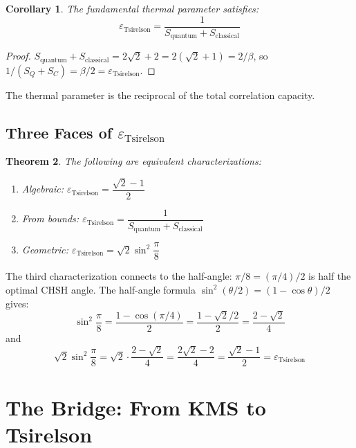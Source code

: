 \documentclass[12pt,a4paper]{article}
\newtheorem{theorem}{Theorem}[section]
\newtheorem{corollary}[theorem]{Corollary}
\newcommand{\eps}{\varepsilon}
\begin{document}
\begin{corollary}
The fundamental thermal parameter satisfies:
\begin{equation}
\eps_{\text{Tsirelson}} = \frac{1}{S_{\text{quantum}} + S_{\text{classical}}}
\end{equation}
\end{corollary}

\begin{proof}
$S_{\text{quantum}} + S_{\text{classical}} = 2\sqrt{2} + 2 = 2(\sqrt{2}+1) = 2/\beta$, so $1/(S_Q + S_C) = \beta/2 = \eps_{\text{Tsirelson}}$.
\end{proof}

The thermal parameter is the reciprocal of the total correlation capacity.

\subsection{Three Faces of $\eps_{\text{Tsirelson}}$}

\begin{theorem}
The following are equivalent characterizations:
\begin{enumerate}
\item Algebraic: $\eps_{\text{Tsirelson}} = \dfrac{\sqrt{2}-1}{2}$
\item From bounds: $\eps_{\text{Tsirelson}} = \dfrac{1}{S_{\text{quantum}} + S_{\text{classical}}}$
\item Geometric: $\eps_{\text{Tsirelson}} = \sqrt{2} \sin^2\dfrac{\pi}{8}$
\end{enumerate}
\end{theorem}

The third characterization connects to the half-angle: $\pi/8 = (\pi/4)/2$ is half the optimal CHSH angle. The half-angle formula $\sin^2(\theta/2) = (1-\cos\theta)/2$ gives:
\begin{equation}
\sin^2\frac{\pi}{8} = \frac{1 - \cos(\pi/4)}{2} = \frac{1 - \sqrt{2}/2}{2} = \frac{2 - \sqrt{2}}{4}
\end{equation}
and
\begin{equation}
\sqrt{2} \sin^2\frac{\pi}{8} = \sqrt{2} \cdot \frac{2-\sqrt{2}}{4} = \frac{2\sqrt{2} - 2}{4} = \frac{\sqrt{2}-1}{2} = \eps_{\text{Tsirelson}}
\end{equation}

\section{The Bridge: From KMS to Tsirelson}
\end{document}
